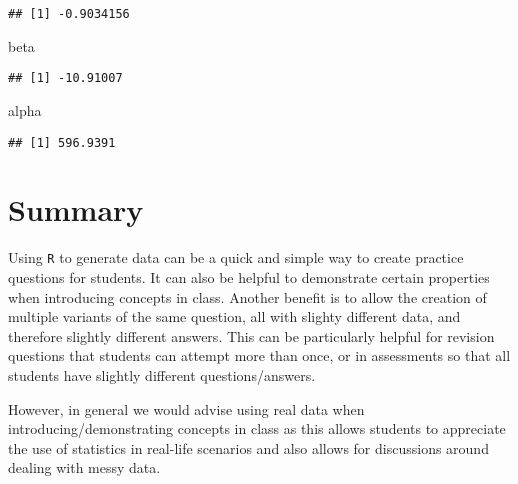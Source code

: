 \documentclass[
]{book}
\newenvironment{Shaded}{\begin{snugshade}}{\end{snugshade}}
\newcommand{\NormalTok}[1]{#1}
\begin{document}
\begin{verbatim}
## [1] -0.9034156
\end{verbatim}

\begin{Shaded}
\begin{Highlighting}[]
\NormalTok{beta}
\end{Highlighting}
\end{Shaded}

\begin{verbatim}
## [1] -10.91007
\end{verbatim}

\begin{Shaded}
\begin{Highlighting}[]
\NormalTok{alpha}
\end{Highlighting}
\end{Shaded}

\begin{verbatim}
## [1] 596.9391
\end{verbatim}

\hypertarget{summary}{%
\section{Summary}\label{summary}}

Using \texttt{R} to generate data can be a quick and simple way to create practice questions for students. It can also be helpful to demonstrate certain properties when introducing concepts in class. Another benefit is to allow the creation of multiple variants of the same question, all with slighty different data, and therefore slightly different answers. This can be particularly helpful for revision questions that students can attempt more than once, or in assessments so that all students have slightly different questions/answers.

However, in general we would advise using real data when introducing/demonstrating concepts in class as this allows students to appreciate the use of statistics in real-life scenarios and also allows for discussions around dealing with messy data.

  
\end{document}
